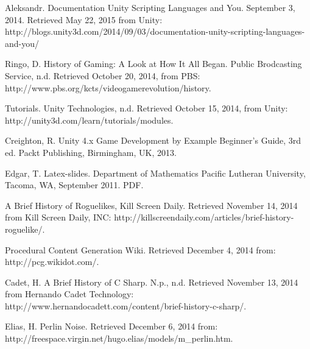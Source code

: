 \documentclass[12pt]{article}       %
\begin{document}



\newpage

\begin{thebibliography}{99}

 Aleksandr. Documentation Unity Scripting Languages and You. September 3, 2014. Retrieved May 22, 2015 from Unity: http://blogs.unity3d.com/2014/09/03/documentation-unity-scripting-languages-and-you/ 

 Ringo, D. History of Gaming: A Look at How It All Began. Public Brodcasting Service, n.d. Retrieved October 20, 2014, from PBS: http://www.pbs.org/kcts/videogamerevolution/history. 

 Tutorials. Unity Technologies, n.d. Retrieved October 15, 2014, from Unity: http://unity3d.com/learn/tutorials/modules.

 Creighton, R. Unity 4.x Game Development by Example Beginner's Guide, 3rd ed. Packt Publishing, Birmingham, UK, 2013.

 Edgar, T. Latex-slides. Department of Mathematics Pacific Lutheran University, Tacoma, WA, September 2011. PDF. 

 A Brief History of Roguelikes, Kill Screen Daily. Retrieved November 14, 2014 from Kill Screen Daily, INC: http://killscreendaily.com/articles/brief-history-roguelike/.

 Procedural Content Generation Wiki. Retrieved December 4, 2014 from: http://pcg.wikidot.com/.

 Cadet, H. A Brief History of C Sharp.  N.p., n.d. Retrieved November 13, 2014 from Hernando Cadet Technology:  http://www.hernandocadett.com/content/brief-history-c-sharp/.

 Elias, H. Perlin Noise. Retrieved December 6, 2014 from: http://freespace.virgin.net/hugo.elias/models/m\_perlin.htm.


\end{thebibliography}
\end{document}
